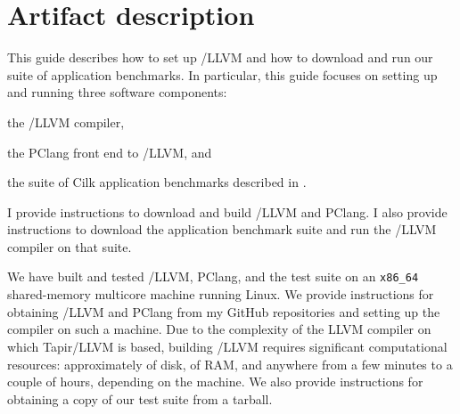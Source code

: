 \newcommand{\arch}{\texttt{x86\_64}\xspace}
\newcommand{\AWSinst}{\texttt{c4.8xlarge}\xspace}


\chapter{Artifact description}

This guide describes how to set up \tapir/LLVM and how to download and
run our suite of application benchmarks.  In particular, this guide
focuses on setting up and running three software components:
\begin{closeitemize}
\item the \tapir/LLVM compiler,
\item the PClang front end to \tapir/LLVM, and
\item the suite of  Cilk application benchmarks
  described in .
\end{closeitemize}
I provide instructions to download and build \tapir/LLVM and PClang.
I also provide instructions to download the application benchmark
suite and run the \tapir/LLVM compiler on that suite.


We have built and tested \tapir/LLVM, PClang, and the test suite on an
\arch shared-memory multicore machine running Linux.  We provide
instructions for obtaining \tapir/LLVM and PClang from my GitHub
repositories and setting up the compiler on such a machine.  Due to
the complexity of the LLVM compiler on which Tapir/LLVM is based,
building \tapir/LLVM requires significant computational resources:
approximately  of disk,
 of RAM, and anywhere from a few
minutes to a couple of hours, depending on the machine.  We also
provide instructions for obtaining a copy of our test suite from a
tarball.

